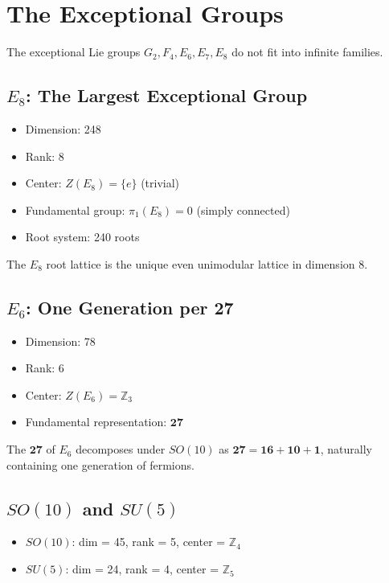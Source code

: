 \documentclass[11pt,a4paper,openright]{book}
\theoremstyle{plain}
\theoremstyle{definition}
\newcommand{\Z}{\mathbb{Z}}
\begin{document}
\section{The Exceptional Groups}

The exceptional Lie groups $G_2, F_4, E_6, E_7, E_8$ do not fit into infinite families.

\subsection{$E_8$: The Largest Exceptional Group}

\begin{itemize}
    \item Dimension: 248
    \item Rank: 8
    \item Center: $Z(E_8) = \{e\}$ (trivial)
    \item Fundamental group: $\pi_1(E_8) = 0$ (simply connected)
    \item Root system: 240 roots
\end{itemize}

The $E_8$ root lattice is the unique even unimodular lattice in dimension 8.

\subsection{$E_6$: One Generation per $\mathbf{27}$}

\begin{itemize}
    \item Dimension: 78
    \item Rank: 6
    \item Center: $Z(E_6) = \Z_3$
    \item Fundamental representation: $\mathbf{27}$
\end{itemize}

The $\mathbf{27}$ of $E_6$ decomposes under $SO(10)$ as $\mathbf{27} = \mathbf{16} + \mathbf{10} + \mathbf{1}$, naturally containing one generation of fermions.

\subsection{$SO(10)$ and $SU(5)$}

\begin{itemize}
    \item $SO(10)$: dim = 45, rank = 5, center = $\Z_4$
    \item $SU(5)$: dim = 24, rank = 4, center = $\Z_5$
\end{itemize}
\end{document}

